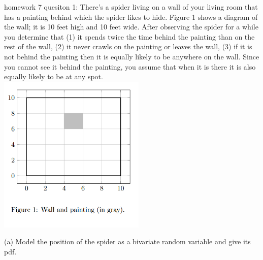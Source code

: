\documentclass[10pt]{article}
\begin{document}
homework 7 quesiton 1: There’s a spider living on a wall of your living room that has a painting
behind which the spider likes to hide. Figure 1 shows a diagram of the wall; it is 10 feet
high and 10 feet wide.
After observing the spider for a while you determine that (1) it spends twice the time
behind the painting than on the rest of the wall, (2) it never crawls on the painting or
leaves the wall, (3) if it is not behind the painting then it is equally likely to be anywhere
on the wall. Since you cannot see it behind the painting, you assume that when it is there
it is also equally likely to be at any spot.
\\\includegraphics[width=7cm]{final practice/heomwortk 7 question 1.png}


(a) Model the position of the spider as a bivariate random variable and give its pdf.
\end{document}
